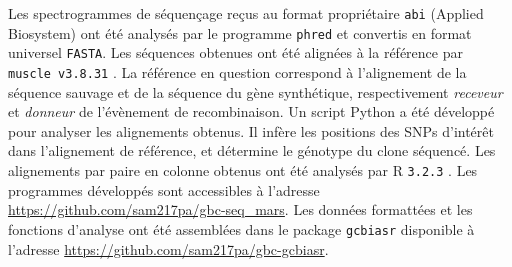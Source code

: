 Les spectrogrammes de séquençage reçus au format propriétaire \texttt{abi}
(Applied Biosystem) ont été analysés par le programme \texttt{phred}
\cite{ewing_base-calling_1998} et convertis en format universel \texttt{FASTA}.
Les séquences obtenues ont été alignées à la référence par \texttt{ muscle
	v3.8.31} \cite{edgar_muscle:_2004}. La référence en question correspond
à l'alignement de la séquence sauvage et de la séquence du gène synthétique,
respectivement \emph{receveur} et \emph{donneur} de l'évènement de
recombinaison. Un script Python \cite{cock_biopython:_2009} a été développé
pour analyser les alignements obtenus. Il infère les positions des SNPs
d'intérêt dans l'alignement de référence, et détermine le génotype du clone
séquencé. Les alignements par paire en colonne obtenus ont été analysés par
\textrm{R} \texttt{3.2.3} \cite{r_core_team_r:_2015}. Les programmes développés
sont accessibles à l'adresse \url{https://github.com/sam217pa/gbc-seq_mars}.
Les données formattées et les fonctions d'analyse ont été assemblées dans le
package \texttt{gcbiasr} disponible à l'adresse
\url{https://github.com/sam217pa/gbc-gcbiasr}.

